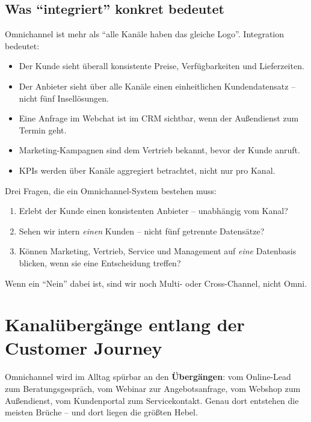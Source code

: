 \documentclass[11pt,a4paper,oneside]{article}
\newcommand{\fachbegriff}[1]{\textbf{#1}}
\begin{document}
\subsection{Was ``integriert'' konkret bedeutet}

Omnichannel ist mehr als ``alle Kanäle haben das gleiche Logo''. Integration bedeutet:

\begin{itemize}
  \item Der Kunde sieht überall konsistente Preise, Verfügbarkeiten und Lieferzeiten.
  \item Der Anbieter sieht über alle Kanäle einen einheitlichen Kundendatensatz -- nicht fünf Insellösungen.
  \item Eine Anfrage im Webchat ist im CRM sichtbar, wenn der Außendienst zum Termin geht.
  \item Marketing-Kampagnen sind dem Vertrieb bekannt, bevor der Kunde anruft.
  \item KPIs werden über Kanäle aggregiert betrachtet, nicht nur pro Kanal.
\end{itemize}

\begin{merkbox}
Drei Fragen, die ein Omnichannel-System bestehen muss:
\begin{enumerate}
  \item Erlebt der Kunde einen konsistenten Anbieter -- unabhängig vom Kanal?
  \item Sehen wir intern \emph{einen} Kunden -- nicht fünf getrennte Datensätze?
  \item Können Marketing, Vertrieb, Service und Management auf \emph{eine} Datenbasis blicken, wenn sie eine Entscheidung treffen?
\end{enumerate}
Wenn ein ``Nein'' dabei ist, sind wir noch Multi- oder Cross-Channel, nicht Omni.
\end{merkbox}

\section{Kanalübergänge entlang der Customer Journey}

Omnichannel wird im Alltag spürbar an den \fachbegriff{Übergängen}: vom Online-Lead zum Beratungsgespräch, vom Webinar zur Angebotsanfrage, vom Webshop zum Außendienst, vom Kundenportal zum Servicekontakt. Genau dort entstehen die meisten Brüche -- und dort liegen die größten Hebel.
\end{document}

